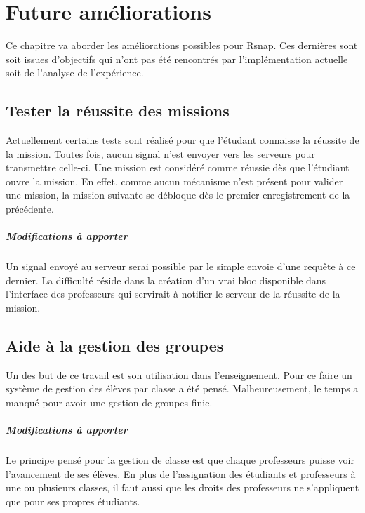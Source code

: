 \chapter{Future améliorations}
Ce chapitre va aborder les améliorations possibles pour Rsnap. Ces dernières sont soit issues d'objectifs qui n'ont pas été rencontrés par l'implémentation actuelle soit de l'analyse de l'expérience. %

\section{Tester la réussite des missions}
Actuellement certains tests sont réalisé pour que l'étudant connaisse la réussite de la mission. Toutes fois, aucun signal n'est envoyer vers les serveurs pour transmettre celle-ci. Une mission est considéré comme réussie dès que l'étudiant ouvre la mission. En effet, comme aucun mécanisme n'est présent pour valider une mission, la mission suivante se débloque dès le premier enregistrement de la précédente.

\paragraph{Modifications à apporter}
Un signal envoyé au serveur serai possible par le simple envoie d'une requête à ce dernier. La difficulté réside dans la création d'un vrai bloc disponible dans l'interface des professeurs qui servirait à notifier le serveur de la réussite de la mission.

\section{Aide à la gestion des groupes}
Un des but de ce travail est son utilisation dans l'enseignement. Pour ce faire un système de gestion des élèves par classe a été pensé. Malheureusement, le temps a manqué pour avoir une gestion de groupes finie. 

\paragraph{Modifications à apporter}
Le principe pensé pour la gestion de classe est que chaque professeurs puisse voir l'avancement de ses élèves. En plus de l'assignation des étudiants et professeurs à une ou plusieurs classes, il faut aussi que les droits des professeurs ne s'appliquent que pour ses propres étudiants. 

